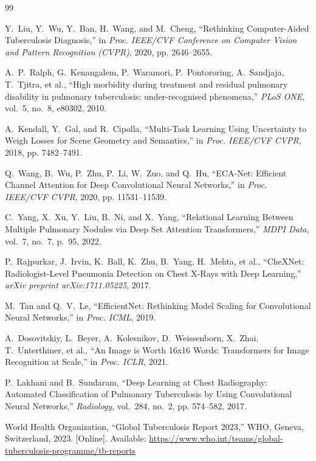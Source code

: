 \documentclass[12pt]{report}
\begin{document}
\renewcommand\bibname{References}
\begin{thebibliography}{99}

Y.~Liu, Y.~Wu, Y.~Ban, H.~Wang, and M.~Cheng, ``Rethinking Computer-Aided Tuberculosis Diagnosis,'' in \emph{Proc. IEEE/CVF Conference on Computer Vision and Pattern Recognition (CVPR)}, 2020, pp. 2646--2655.

A.~P.~Ralph, G.~Kenangalem, P.~Waramori, P.~Pontororing, A.~Sandjaja, T.~Tjitra, et al., ``High morbidity during treatment and residual pulmonary disability in pulmonary tuberculosis: under-recognised phenomena,'' \emph{PLoS ONE}, vol.~5, no.~8, e80302, 2010.

A.~Kendall, Y.~Gal, and R.~Cipolla, ``Multi-Task Learning Using Uncertainty to Weigh Losses for Scene Geometry and Semantics,'' in \emph{Proc. IEEE/CVF CVPR}, 2018, pp. 7482--7491.

Q.~Wang, B.~Wu, P.~Zhu, P.~Li, W.~Zuo, and Q.~Hu, ``ECA-Net: Efficient Channel Attention for Deep Convolutional Neural Networks,'' in \emph{Proc. IEEE/CVF CVPR}, 2020, pp. 11531--11539.

C.~Yang, X.~Xu, Y.~Liu, B.~Ni, and X.~Yang, ``Relational Learning Between Multiple Pulmonary Nodules via Deep Set Attention Transformers,'' \emph{MDPI Data}, vol.~7, no.~7, p.~95, 2022.

P.~Rajpurkar, J.~Irvin, K.~Ball, K.~Zhu, B.~Yang, H.~Mehta, et al., ``CheXNet: Radiologist-Level Pneumonia Detection on Chest X-Rays with Deep Learning,'' \emph{arXiv preprint arXiv:1711.05225}, 2017.

M.~Tan and Q.~V.~Le, ``EfficientNet: Rethinking Model Scaling for Convolutional Neural Networks,'' in \emph{Proc. ICML}, 2019.

A.~Dosovitskiy, L.~Beyer, A.~Kolesnikov, D.~Weissenborn, X.~Zhai, T.~Unterthiner, et al., ``An Image is Worth 16x16 Words: Transformers for Image Recognition at Scale,'' in \emph{Proc. ICLR}, 2021.

P.~Lakhani and B.~Sundaram, ``Deep Learning at Chest Radiography: Automated Classification of Pulmonary Tuberculosis by Using Convolutional Neural Networks,'' \emph{Radiology}, vol.~284, no.~2, pp. 574--582, 2017.

World Health Organization, ``Global Tuberculosis Report 2023,'' WHO, Geneva, Switzerland, 2023. [Online]. Available: \url{https://www.who.int/teams/global-tuberculosis-programme/tb-reports}


\end{thebibliography}
\end{document}
